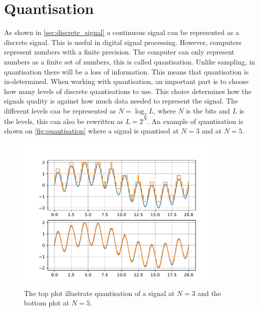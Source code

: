 \section{Quantisation}
As shown in \autoref{sec:discrete_signal} a continuous signal can be represented as a discrete signal. This is useful in digital signal processing. However, computers represent numbers with a finite precision. The computer can only represent numbers as a finite set of numbers, this is called quantisation. Unlike sampling, in quantisation there will be a loss of information. This means that quantisation is in-determined. When working with quantisation, an important part is to choose how many levels of discrete quantisations to use. This choice determines how the signals quality is against how much data needed to represent the signal. %
The different levels can be represented as $N=\log_{2} L$, where $N$ is the bits and $L$ is the levels, this can also be rewritten as $L=2^{N}$. An example of quantisation is shown on \autoref{fig:quantisation} where a signal is quantised at $N=3$ and at $N=5$. 
\begin{figure}[H]
    \centering
    \includegraphics[width=0.9\textwidth]{figures/quantisationFig.pdf}
    \caption{The top plot illustrate quantisation of a signal at $N=3$ and the bottom plot at $N=5$.}
    \label{fig:quantisation}
\end{figure}